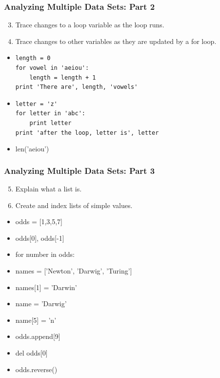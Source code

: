 \documentclass[xcolor=dvipsnames]{beamer}
\begin{document}
\begin{frame}[fragile]
\frametitle{Analyzing Multiple Data Sets: Part 2}
\begin{enumerate}
\setcounter{enumi}{2}
\item    Trace changes to a loop variable as the loop runs.
\item    Trace changes to other variables as they are updated by a for loop.
\end{enumerate}
\begin{itemize}
\item
\begin{verbatim}
length = 0
for vowel in 'aeiou':
    length = length + 1
print 'There are', length, 'vowels'
\end{verbatim}
\item
\begin{verbatim}
letter = 'z'
for letter in 'abc':
    print letter
print 'after the loop, letter is', letter
\end{verbatim}
\item len('aeiou')
\end{itemize}
\end{frame}

\begin{frame}
\frametitle{Analyzing Multiple Data Sets: Part 3}
\begin{enumerate}
\setcounter{enumi}{4}
\item     Explain what a list is.
\item    Create and index lists of simple values.
\end{enumerate}
\begin{multicols}{2}
\begin{itemize}
\item odds = [1,3,5,7]
\item odds[0], odds[-1]
\item for number in odds:
\item names = ['Newton', 'Darwig', 'Turing']
\item names[1] = 'Darwin'
\item name = 'Darwig'
\item name[5] = 'n'
\item odds.append[9]
\item del odds[0]
\item odds.reverse()
\end{itemize}
\end{multicols}
\end{frame}
\end{document}
